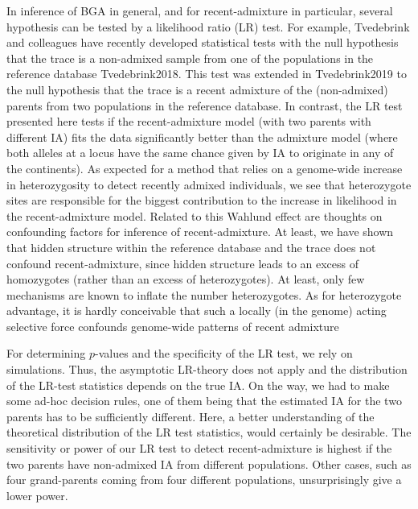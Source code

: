 \documentclass[12pt]{article}
\theoremstyle{definition}
\begin{document}
In inference of BGA in general, {\color{blue} and for recent-admixture in particular}, several hypothesis can be tested by a likelihood ratio (LR) test. For example, Tvedebrink and colleagues have recently developed statistical tests with the null hypothesis that the trace is a non-admixed sample from one of the populations in the reference database \cite{article}{Tvedebrink2018}. This test was extended in \cite{article}{Tvedebrink2019} to the null hypothesis that the trace is a recent admixture of the (non-admixed) parents from two populations in the reference database. In contrast, the LR test presented here tests if the recent-admixture model (with two parents with different IA) fits the data significantly better than the admixture model (where both alleles at a locus have the same chance given by IA to originate in any of the continents). As expected for a method that relies on a genome-wide increase in heterozygosity to detect recently admixed individuals, we see that heterozygote sites are responsible for the biggest contribution to the increase in likelihood in the recent-admixture model. {\color{blue} Related to this Wahlund effect are thoughts on confounding factors for inference of recent-admixture. At least, we have shown that hidden structure within the reference database and the trace does not confound recent-admixture, since hidden structure leads to an excess of homozygotes (rather than an excess of heterozygotes). At least, only few mechanisms are known to inflate the number heterozygotes. As for heterozygote advantage, it is hardly conceivable that such a locally (in the genome) acting selective force confounds {\color{blue}genome-wide patterns of} recent admixture}

{\color{blue} For determining $p$-values and the specificity of the LR test, we rely on simulations. Thus, the asymptotic LR-theory does not apply and the distribution of the LR-test statistics depends on the true IA. On the way, we had to make some ad-hoc decision rules, one of them being that the estimated IA for the two parents has to be sufficiently different. Here, a better understanding of the theoretical distribution of the LR test statistics, would certainly be desirable. The sensitivity or power of our LR test to detect recent-admixture is highest  if the two parents have non-admixed IA from different populations. Other cases, such as four grand-parents coming from four different populations, unsurprisingly give a lower power. 
}
\end{document}
